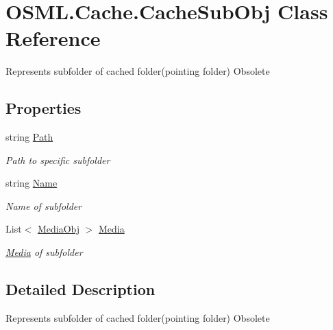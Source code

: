 \hypertarget{classOSML_1_1Cache_1_1CacheSubObj}{}\section{O\+S\+M\+L.\+Cache.\+Cache\+Sub\+Obj Class Reference}
\label{classOSML_1_1Cache_1_1CacheSubObj}


Represents subfolder of cached folder(pointing folder) Obsolete  


\subsection*{Properties}
\begin{DoxyCompactItemize}
\item 
string \mbox{\hyperlink{classOSML_1_1Cache_1_1CacheSubObj_ab221125b0dc1a4669b9698bfa0fa0d07}{Path}}
\begin{DoxyCompactList}\small\item\em Path to specific subfolder \end{DoxyCompactList}\item 
string \mbox{\hyperlink{classOSML_1_1Cache_1_1CacheSubObj_a3eb622bfe319c5e4343012487b7000e4}{Name}}
\begin{DoxyCompactList}\small\item\em Name of subfolder \end{DoxyCompactList}\item 
List$<$ \mbox{\hyperlink{classOSML_1_1Media_1_1MediaObj}{Media\+Obj}} $>$ \mbox{\hyperlink{classOSML_1_1Cache_1_1CacheSubObj_a99b9e9474b6941657419e33fdca1688b}{Media}}
\begin{DoxyCompactList}\small\item\em \mbox{\hyperlink{namespaceOSML_1_1Media}{Media}} of subfolder \end{DoxyCompactList}\end{DoxyCompactItemize}


\subsection{Detailed Description}
Represents subfolder of cached folder(pointing folder) Obsolete 



